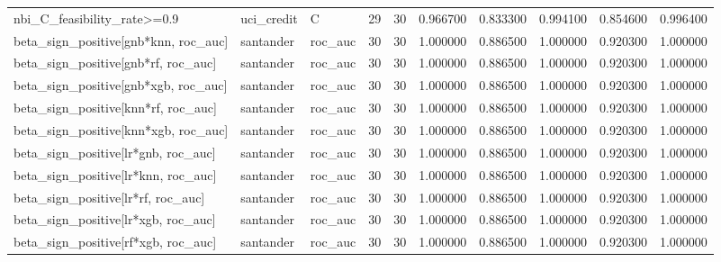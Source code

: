 \begin{longtable}{lllrrrrrrr}
nbi\_C\_feasibility\_rate>=0.9 & uci\_credit & C & 29 & 30 & 0.966700 & 0.833300 & 0.994100 & 0.854600 & 0.996400 \\
beta\_sign\_positive[gnb*knn, roc\_auc] & santander & roc\_auc & 30 & 30 & 1.000000 & 0.886500 & 1.000000 & 0.920300 & 1.000000 \\
beta\_sign\_positive[gnb*rf, roc\_auc] & santander & roc\_auc & 30 & 30 & 1.000000 & 0.886500 & 1.000000 & 0.920300 & 1.000000 \\
beta\_sign\_positive[gnb*xgb, roc\_auc] & santander & roc\_auc & 30 & 30 & 1.000000 & 0.886500 & 1.000000 & 0.920300 & 1.000000 \\
beta\_sign\_positive[knn*rf, roc\_auc] & santander & roc\_auc & 30 & 30 & 1.000000 & 0.886500 & 1.000000 & 0.920300 & 1.000000 \\
beta\_sign\_positive[knn*xgb, roc\_auc] & santander & roc\_auc & 30 & 30 & 1.000000 & 0.886500 & 1.000000 & 0.920300 & 1.000000 \\
beta\_sign\_positive[lr*gnb, roc\_auc] & santander & roc\_auc & 30 & 30 & 1.000000 & 0.886500 & 1.000000 & 0.920300 & 1.000000 \\
beta\_sign\_positive[lr*knn, roc\_auc] & santander & roc\_auc & 30 & 30 & 1.000000 & 0.886500 & 1.000000 & 0.920300 & 1.000000 \\
beta\_sign\_positive[lr*rf, roc\_auc] & santander & roc\_auc & 30 & 30 & 1.000000 & 0.886500 & 1.000000 & 0.920300 & 1.000000 \\
beta\_sign\_positive[lr*xgb, roc\_auc] & santander & roc\_auc & 30 & 30 & 1.000000 & 0.886500 & 1.000000 & 0.920300 & 1.000000 \\
beta\_sign\_positive[rf*xgb, roc\_auc] & santander & roc\_auc & 30 & 30 & 1.000000 & 0.886500 & 1.000000 & 0.920300 & 1.000000 \\
\end{longtable}\endgroup\addtocounter{table}{-1}
